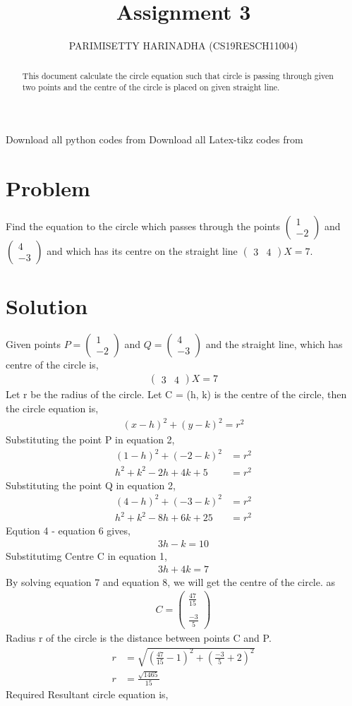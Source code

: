 \documentclass[journal,12pt,twocolumn]{IEEEtran}
\title{Assignment 3}
\author{PARIMISETTY HARINADHA (CS19RESCH11004)}
\newcommand{\myvec}[1]{\ensuremath{\begin{pmatrix}#1\end{pmatrix}}}
\begin{document}
\maketitle
\newpage
\begin{abstract}
This document calculate the circle equation such that circle is passing through given two points and the centre of the circle is placed on given straight line.
\end{abstract}
Download all python codes from 
Download all Latex-tikz codes from 
\section{Problem}
Find the equation to the circle which passes through the points $\myvec{ 1 \\ -2 }$ and $\myvec{ 4 \\ -3 }$ and which has its centre on the straight line $\myvec{ 3 & 4 }X = 7$.

\section{Solution}
Given points $P = \myvec{ 1 \\ -2 }$ and $Q = \myvec{ 4 \\ -3 }$ and the straight line, which has centre of the circle is,
\begin{align} 
\myvec{ 3 & 4 }X = 7
\end {align}
Let r be the radius of the circle.
Let C = (h, k) is the centre of the circle, then the circle equation is,
\begin{align} 
(x-h)^2 + (y-k)^2 = r^2
\end {align}
Substituting the point P in equation 2,
\begin{align} 
(1-h)^2 + (-2-k)^2 &= r^2 \\
h^2 + k^2 -2h + 4k +5 &= r^2
\end {align}
Substituting the point Q in equation 2,
\begin{align} 
(4-h)^2 + (-3-k)^2 &= r^2 \\
h^2 + k^2 -8h + 6k + 25 &= r^2
\end {align}
Eqution 4 - equation 6 gives,
\begin{align} 
3h - k = 10
\end {align}
Substitutimg Centre C in equation 1,
\begin{align} 
3h + 4k = 7
\end {align}
By solving equation 7 and equation 8, we will get the centre of the circle.
 as 
\begin{align} 
C = \myvec{ \frac{47}{15}\\ \\ \frac{-3}{5} }
\end {align}
Radius r of the circle is the distance between points C and P.
\begin{align} 
r &= \sqrt{(\frac{47}{15} - 1)^2 + (\frac{-3}{5} + 2)^2} \\
r &= \frac{\sqrt{1465}}{15}
\end {align}
Required Resultant circle equation is,
\end{document}
